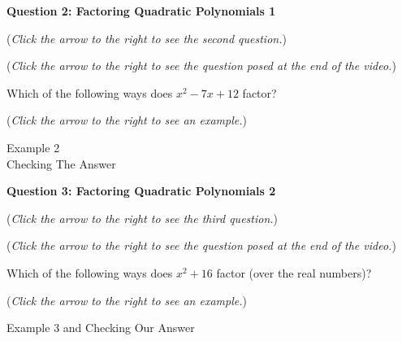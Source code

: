 \documentclass{ximera}
\begin{document}
\textbf{Question 2: Factoring Quadratic Polynomials 1}
\begin{question}
\begin{flushright}
{\color{blue}(\emph{Click the arrow to the right to see the second question.})}
\end{flushright}
\begin{center}
\begin{expandable}
{\color{blue}(\emph{Click the arrow to the right to see the  question
posed at the end of the video.})}
\begin{expandable}
Which of the following ways does $x^2-7x+12$ factor?
\begin{multipleChoice}
\end{multipleChoice}
\begin{flushright}
{\color{blue}(\emph{Click the arrow to the right to see an example.})}
\end{flushright}
\begin{expandable}
Example 2
\\

Checking The Answer
\end{expandable}
\end{expandable}
\end{expandable}
\end{center}
\end{question}


\textbf{Question 3: Factoring Quadratic Polynomials 2}
\begin{question}
\begin{flushright}
{\color{blue}(\emph{Click the arrow to the right to see the third question.})}
\end{flushright}
\begin{center}
\begin{expandable}
{\color{blue}(\emph{Click the arrow to the right to see the  question
posed at the end of the video.})}
\begin{expandable}
Which of the following ways does $x^2+16$ factor (over the real numbers)?
\begin{multipleChoice}
\end{multipleChoice}
\begin{flushright}
{\color{blue}(\emph{Click the arrow to the right to see an example.})}
\end{flushright}
\begin{expandable}
Example 3 and Checking Our Answer
\end{expandable}
\end{expandable}
\end{expandable}
\end{center}
\end{question}
\end{document}
